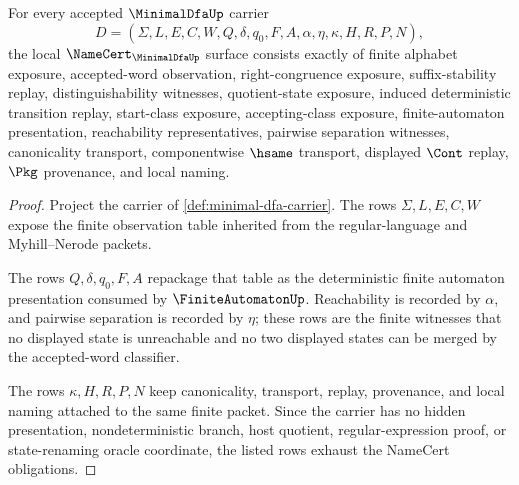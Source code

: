 \begin{theorem}
\label{thm:minimal-dfa-namecert-obligations}
For every accepted $\MinimalDfaUp$ carrier
$$
D=(\Sigma,L,E,C,W,Q,\delta,q_0,F,A,\alpha,\eta,\kappa,H,R,P,N),
$$
the local $\NameCert_{\MinimalDfaUp}$ surface consists exactly of finite alphabet exposure, accepted-word observation, right-congruence exposure, suffix-stability replay, distinguishability witnesses, quotient-state exposure, induced deterministic transition replay, start-class exposure, accepting-class exposure, finite-automaton presentation, reachability representatives, pairwise separation witnesses, canonicality transport, componentwise $\hsame$ transport, displayed $\Cont$ replay, $\Pkg$ provenance, and local naming.
\end{theorem}
\begin{proof}
Project the carrier of \autoref{def:minimal-dfa-carrier}. The rows $\Sigma,L,E,C,W$ expose the finite observation table inherited from the regular-language and Myhill--Nerode packets.

The rows $Q,\delta,q_0,F,A$ repackage that table as the deterministic finite automaton presentation consumed by $\FiniteAutomatonUp$. Reachability is recorded by $\alpha$, and pairwise separation is recorded by $\eta$; these rows are the finite witnesses that no displayed state is unreachable and no two displayed states can be merged by the accepted-word classifier.

The rows $\kappa,H,R,P,N$ keep canonicality, transport, replay, provenance, and local naming attached to the same finite packet. Since the carrier has no hidden presentation, nondeterministic branch, host quotient, regular-expression proof, or state-renaming oracle coordinate, the listed rows exhaust the NameCert obligations.
\end{proof}

